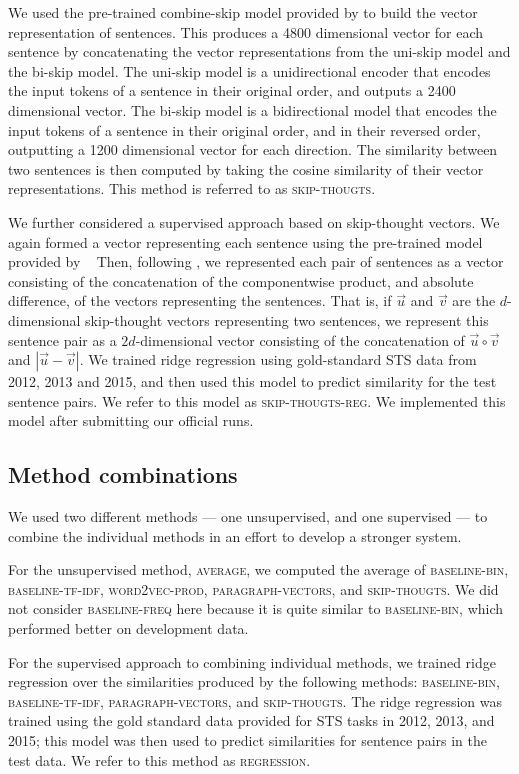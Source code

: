 \documentclass[11pt,letterpaper]{article}
\newcommand{\baselinebin}{\textsc{baseline-bin}\xspace}
\newcommand{\baselinefreq}{\textsc{baseline-freq}\xspace}
\newcommand{\baselinetfidf}{\textsc{baseline-tf-idf}\xspace}
\newcommand{\wordvecprod}{\textsc{word2vec-prod}\xspace}
\newcommand{\parvec}{\textsc{paragraph-vectors}\xspace}
\newcommand{\skipthoughts}{\textsc{skip-thougts}\xspace}
\newcommand{\skipthoughtsreg}{\textsc{skip-thougts-reg}\xspace}
\newcommand{\average}{\textsc{average}\xspace}
\newcommand{\reg}{\textsc{regression}\xspace}
\begin{document}
We used the pre-trained combine-skip model provided by
\cite{Kiros+:2015} to build the vector representation of
sentences. This produces a 4800 dimensional vector for each sentence
by concatenating the vector representations from the uni-skip model
and the bi-skip model. The uni-skip model is a unidirectional encoder
that encodes the input tokens of a sentence in their original order,
and outputs a 2400 dimensional vector. The bi-skip model is a
bidirectional model that encodes the input tokens of a sentence in
their original order, and in their reversed order, outputting a 1200
dimensional vector for each direction. The similarity between two
sentences is then computed by taking the cosine similarity of their
vector representations. This method is referred to as \skipthoughts.

We further considered a supervised approach based on skip-thought
vectors. We again formed a vector representing each sentence using the
pre-trained model provided by \citeauthor{Kiros+:2015}~ Then,
following \citeauthor{Kiros+:2015}, we represented each pair of
sentences as a vector consisting of the concatenation of the
componentwise product, and absolute difference, of the vectors
representing the sentences. That is, if $\vec{u}$ and $\vec{v}$ are
the $d$-dimensional skip-thought vectors representing two sentences,
we represent this sentence pair as a $2d$-dimensional vector
consisting of the concatenation of $\vec{u} \circ \vec{v}$ and
$|\vec{u} - \vec{v}|$. We trained ridge regression using gold-standard
STS data from 2012, 2013 and 2015, and then used this model to predict
similarity for the test sentence pairs. We refer to this model as
\skipthoughtsreg. We implemented this model after submitting our
official runs.


\subsection{Method combinations\label{sec:combmethods}}

We used two different methods --- one unsupervised, and one supervised
--- to combine the individual methods in an effort to develop a
stronger system.

For the unsupervised method, \average, we computed the average of
\baselinebin, \baselinetfidf, \wordvecprod, \parvec, and
\skipthoughts. We did not consider \baselinefreq here because it is
quite similar to \baselinebin, which performed better on development
data.

For the supervised approach to combining individual methods, we
trained ridge regression over the similarities produced by the
following methods: \baselinebin, \baselinetfidf, \parvec, and
\skipthoughts.
The ridge regression was trained using the gold standard data provided
for STS tasks in 2012, 2013, and 2015; this model was then used to
predict similarities for sentence pairs in the test data. We refer to
this method as \reg.
\end{document}
